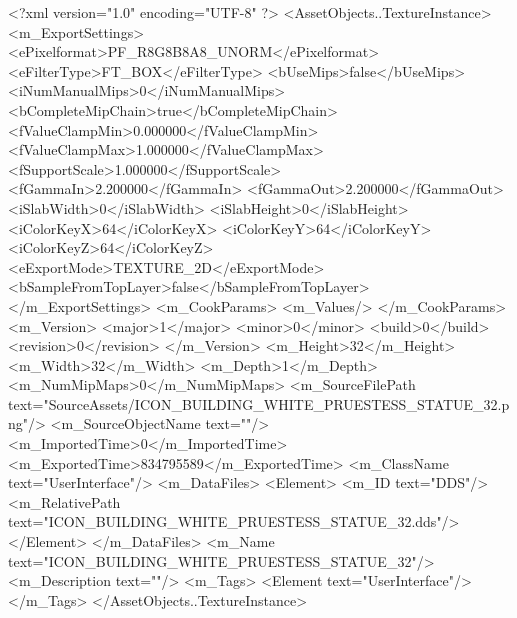<?xml version="1.0" encoding="UTF-8" ?>
<AssetObjects..TextureInstance>
	<m_ExportSettings>
		<ePixelformat>PF_R8G8B8A8_UNORM</ePixelformat>
		<eFilterType>FT_BOX</eFilterType>
		<bUseMips>false</bUseMips>
		<iNumManualMips>0</iNumManualMips>
		<bCompleteMipChain>true</bCompleteMipChain>
		<fValueClampMin>0.000000</fValueClampMin>
		<fValueClampMax>1.000000</fValueClampMax>
		<fSupportScale>1.000000</fSupportScale>
		<fGammaIn>2.200000</fGammaIn>
		<fGammaOut>2.200000</fGammaOut>
		<iSlabWidth>0</iSlabWidth>
		<iSlabHeight>0</iSlabHeight>
		<iColorKeyX>64</iColorKeyX>
		<iColorKeyY>64</iColorKeyY>
		<iColorKeyZ>64</iColorKeyZ>
		<eExportMode>TEXTURE_2D</eExportMode>
		<bSampleFromTopLayer>false</bSampleFromTopLayer>
	</m_ExportSettings>
	<m_CookParams>
		<m_Values/>
	</m_CookParams>
	<m_Version>
		<major>1</major>
		<minor>0</minor>
		<build>0</build>
		<revision>0</revision>
	</m_Version>
	<m_Height>32</m_Height>
	<m_Width>32</m_Width>
	<m_Depth>1</m_Depth>
	<m_NumMipMaps>0</m_NumMipMaps>
	<m_SourceFilePath text="SourceAssets/ICON_BUILDING_WHITE_PRUESTESS_STATUE_32.png"/>
	<m_SourceObjectName text=""/>
	<m_ImportedTime>0</m_ImportedTime>
	<m_ExportedTime>834795589</m_ExportedTime>
	<m_ClassName text="UserInterface"/>
	<m_DataFiles>
		<Element>
			<m_ID text="DDS"/>
			<m_RelativePath text="ICON_BUILDING_WHITE_PRUESTESS_STATUE_32.dds"/>
		</Element>
	</m_DataFiles>
	<m_Name text="ICON_BUILDING_WHITE_PRUESTESS_STATUE_32"/>
	<m_Description text=""/>
	<m_Tags>
		<Element text="UserInterface"/>
	</m_Tags>
</AssetObjects..TextureInstance>

